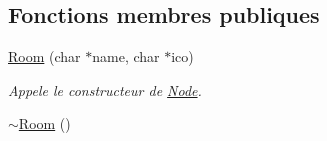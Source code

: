 \subsection*{Fonctions membres publiques}
\begin{DoxyCompactItemize}
\item 
\hyperlink{class_e_p_1_1_room_aefc0919f87a1f6dcfde24923719e6b90}{Room} (char $\ast$name, char $\ast$ico)\hypertarget{class_e_p_1_1_room_aefc0919f87a1f6dcfde24923719e6b90}{}\label{class_e_p_1_1_room_aefc0919f87a1f6dcfde24923719e6b90}

\begin{DoxyCompactList}\small\item\em Appele le constructeur de \hyperlink{class_e_p_1_1_node}{Node}. \end{DoxyCompactList}\item 
\hyperlink{class_e_p_1_1_room_a1dba2dc4fdec31c930b5f538bb4018cf}{$\sim$\+Room} ()\hypertarget{class_e_p_1_1_room_a1dba2dc4fdec31c930b5f538bb4018cf}{}\label{class_e_p_1_1_room_a1dba2dc4fdec31c930b5f538bb4018cf}


\end{DoxyCompactItemize}
